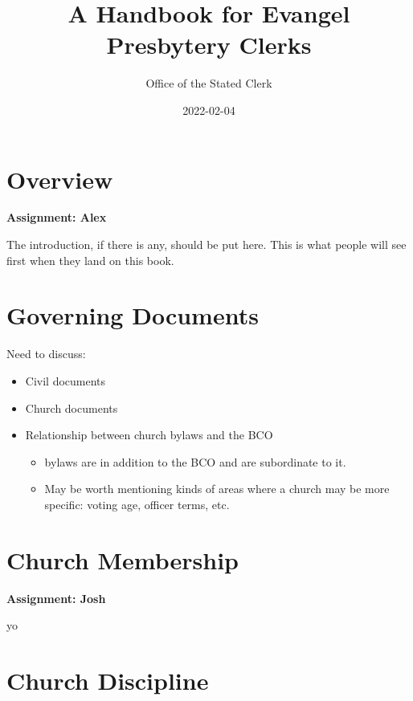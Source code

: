\documentclass[
]{book}
\title{A Handbook for Evangel Presbytery Clerks}
\author{Office of the Stated Clerk}
\date{2022-02-04}
\providecommand{\tightlist}{%
  \setlength{\itemsep}{0pt}\setlength{\parskip}{0pt}}
\begin{document}
\maketitle

{
\setcounter{tocdepth}{1}
\tableofcontents
}
\hypertarget{overview}{%
\chapter{Overview}\label{overview}}

\textbf{Assignment: Alex}

The introduction, if there is any, should be put here. This is what people will see first when they land on this book.

\hypertarget{governing-documents}{%
\chapter{Governing Documents}\label{governing-documents}}

Need to discuss:

\begin{itemize}
\tightlist
\item
  Civil documents
\item
  Church documents
\item
  Relationship between church bylaws and the BCO

  \begin{itemize}
  \tightlist
  \item
    bylaws are in addition to the BCO and are subordinate to it.
  \item
    May be worth mentioning kinds of areas where a church may be more specific: voting age, officer terms, etc.
  \end{itemize}
\end{itemize}

\hypertarget{church-membership}{%
\chapter{Church Membership}\label{church-membership}}

\textbf{Assignment: Josh}

yo

\hypertarget{church-discipline}{%
\chapter{Church Discipline}\label{church-discipline}}
\end{document}
